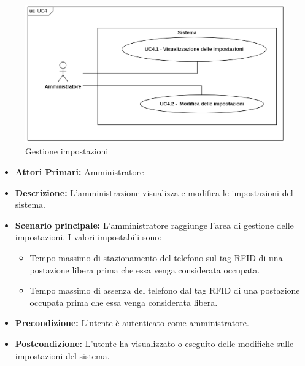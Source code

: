 \begin{figure}[H]
	\centering
	\includegraphics[width=15cm]{res/images/UC4.png}
	\caption{Gestione impostazioni}
	\label{fig:Gestione impostazioni}
\end{figure}
\begin{itemize}
           	\item\textbf{Attori Primari:} 
           	Amministratore
           	\item\textbf{Descrizione:} 
           	L'amministrazione visualizza e modifica le impostazioni del sistema.
           	\item\textbf{Scenario principale:}
           	L'amministratore raggiunge l'area di gestione delle impostazioni.
           	I valori impostabili sono:
           	\begin{itemize}
           		\item Tempo massimo di stazionamento del telefono sul tag RFID di una postazione libera prima che essa venga considerata occupata.
           		\item Tempo massimo di assenza del telefono dal tag RFID di una postazione occupata prima che essa venga considerata libera.
           	\end{itemize}
           	\item\textbf{Precondizione:} 
           	L'utente è autenticato come amministratore.
           	\item\textbf{Postcondizione:}
           	L'utente ha visualizzato o eseguito delle modifiche sulle impostazioni del sistema.
\end{itemize}

